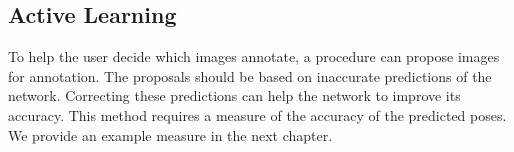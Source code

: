 \subsection{Active Learning}

To help the user decide which images annotate, a procedure can propose images for annotation. The proposals should be based on inaccurate predictions of the network. Correcting these predictions can help the network to improve its accuracy. This method requires a measure of the accuracy of the predicted poses. We provide an example measure in the next chapter.

